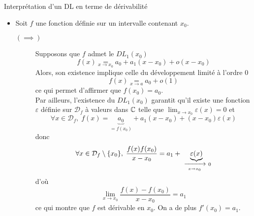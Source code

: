 \documentclass{article}
\date{08 Février 2024}
\begin{document}
\maketitle

\begin{question_kholle}{Interprétation d’un DL en terme de dérivabilité}
	\hfill\\
	\begin{itemize}[label=$\vartriangleright$]
		\item Soit $f$ une fonction définie sur un intervalle contenant $x_{0}$.
		      \begin{description}
			      \item[$(\implies)$] Supposons que $f$ admet le $DL_{1}(x_{0})$
			            \[
				            f(x)\underset{x\to x_{0}}{=} a_{0} + a_{1}(x-x_{0})+o(x-x_{0})
			            \]
			            Alors, son existence implique celle du développement limité à l’ordre 0
			            \[
				            f(x)\underset{x \rightarrow a}{=} a_{0}+o(1)
			            \]
			            ce qui permet d’affirmer que $f(x_{0})=a_{0}$.\\
			            Par ailleurs, l’existence du $DL_{1}(x_{0})$ garantit qu’il existe une fonction $\varepsilon$ définie sur $\mathcal{D}_{f}$ à valeurs dans $\mathbb C$ telle que $\lim_{x\to x_{0}}\varepsilon(x)=0$ et
			            \[
				            \forall x\in \mathcal{D}_{f} ,\; f(x)=\underbrace{a_{0}}_{=f(x_{0})} + a_{1}(x-x_{0}) + (x-x_{0})\varepsilon (x)
			            \]
			            donc
			            \[
				            \forall x\in \mathcal{D}_{f}\setminus \{x_{0}\},\; \frac{f(x)f(x_{0})}{x-x_{0}}=a_{1}+\underbrace{\varepsilon(x)}_{\ \xrightarrow[\;x \to x_{0}\;]{}\ 0}
			            \]
			            d’où
			            \[
				            \lim_{x\to x_{0}}\frac{f(x)-f(x_{0})}{x-x_{0}}=a_{1}
			            \]
			            ce qui montre que $f$ est dérivable en $x_{0}$. On a de plus $f'(x_{0})=a_{1}$.


\end{description}
\end{itemize}
\end{question_kholle}
\end{document}
